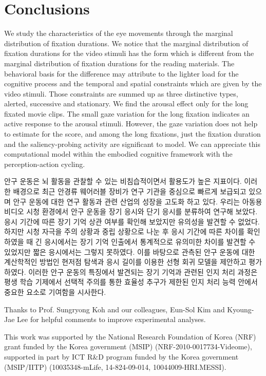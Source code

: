 \documentclass[oneside,master]{snueethesis}
\begin{document}
\chapter{Conclusions}

We study the characteristics of the eye movements through the marginal distribution of fixation durations. We notice that the marginal distribution of fixation durations for the video stimuli has the form which is different from the marginal distribution of fixation durations for the reading materials. The behavioral basis for the difference may attribute to the lighter load for the cognitive process and the temporal and spatial constraints which are given by the video stimuli. Those constraints are summed up as three distinctive types, alerted, successive and stationary. We find the arousal effect only for the long fixated movie clips. The small gaze variation for the long fixation indicates an active response to the arousal stimuli. However, the gaze variation does not help to estimate for the score, and among the long fixations, just the fixation duration and the saliency-probing activity are significant to model. We can appreciate this computational model within the embodied cognitive framework with the perception-action cycling.






\begin{abstractalt}
안구 운동은 뇌 활동을 관찰할 수 있는 비침습적이면서 활용도가 높은 지표이다. 이러한 배경으로 최근 안경류 웨어러블 장비가 연구 기관을 중심으로 빠르게 보급되고 있으며 안구 운동에 대한 연구 활동과 관련 산업의 성장을 고도화 하고 있다. 우리는 아동용 비디오 시청 환경에서 안구 운동을 장기 응시와 단기 응시를 분류하여 연구해 보았다. 응시 기간에 따른 장기 기억 상관 여부를 확인해 보았지만 유의성을 발견할 수 없었다. 하지만 시청 자극을 주의 상황과 중립 상황으로 나눈 후 응시 기간에 따른 차이를 확인 하였을 때 긴 응시에서는 장기 기억 인출에서 통계적으로 유의미한 차이를 발견할 수 있었지만 짧은 응시에서는 그렇지 못하였다. 이를 바탕으로 관측된 안구 운동에 대한 계산학적인 방법인 현저점 탐색과 응시 길이를 이용한 선형 회귀 모델을 제안하고 평가하였다. 이러한 안구 운동의 특징에서 발견되는 장기 기억과 관련된 인지 처리 과정은 평생 학습 기제에서 선택적 주의를 통한 효율성 추구가 제한된 인지 처리 능력 안에서 중요한 요소로 기여함을 시사한다.
\end{abstractalt}

\acknowledgement
Thanks to Prof. Sungryong Koh and our colleagues, Eun-Sol Kim and Kyoung-Jae Lee for helpful comments to improve experimental analyses.

This work was supported by the National Research Foundation of Korea (NRF) grant funded by the Korea government (MSIP) (NRF-2010-0017734-Videome),
supported in part by ICT R\&D program funded by the Korea government (MSIP/IITP) (10035348-mLife, 14-824-09-014, 10044009-HRI.MESSI).
\end{document}
